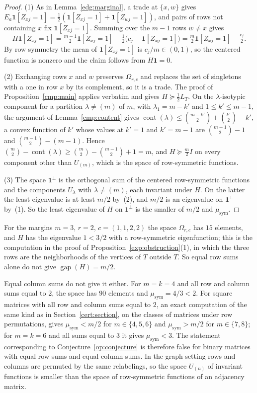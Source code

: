 \begin{proof}
(1) As in Lemma~\ref{edg:marginal}, a trade at $\{x,w\}$ gives
$E_a\mathbf1[Z_{xj}=1]=\tfrac12(\mathbf1[Z_{xj}=1]+\mathbf1[Z_{wj}=1])$, and
pairs of rows not containing $x$ fix $\mathbf1[Z_{xj}=1]$. Summing over the
$m-1$ rows $w\ne x$ gives
\[
 H\mathbf1[Z_{xj}=1]=\tfrac{m-1}2\mathbf1[Z_{xj}=1]
 -\tfrac12\bigl(c_j-\mathbf1[Z_{xj}=1]\bigr)
 =\tfrac m2\mathbf1[Z_{xj}=1]-\tfrac{c_j}2 .
\]
By row symmetry the mean of $\mathbf1[Z_{xj}=1]$ is $c_j/m\in(0,1)$, so the
centered function is nonzero and the claim follows from $H\mathbf1=0$.

(2) Exchanging rows $x$ and $w$ preserves $\Omega_{r,c}$ and replaces the set
of singletons with a one in row $x$ by its complement, so it is a trade. The
proof of Proposition~\ref{cmp:main} applies verbatim and gives
$H\succeq\tfrac12L_T$. On the $\lambda$-isotypic component for a partition
$\lambda\ne(m)$ of $m$, with $\lambda_1=m-k'$ and $1\le k'\le m-1$, the
argument of Lemma~\ref{cmp:content} gives
$\operatorname{cont}(\lambda)\le\binom{m-k'}2+\binom{k'}2-k'$, a convex
function of $k'$ whose values at $k'=1$ and $k'=m-1$ are
$\binom{m-1}2-1$ and $\binom{m-1}2-(m-1)$. Hence
$\binom m2-\operatorname{cont}(\lambda)\ge\binom m2-\binom{m-1}2+1=m$, and
$H\succeq\tfrac m2I$ on every component other than $U_{(m)}$, which is the
space of row-symmetric functions.

(3) The space $\mathbf1^\perp$ is the orthogonal sum of the centered
row-symmetric functions and the components $U_\lambda$ with
$\lambda\ne(m)$, each invariant under $H$. On the latter the least eigenvalue
is at least $m/2$ by~(2), and $m/2$ is an eigenvalue on $\mathbf1^\perp$
by~(1). So the least eigenvalue of $H$ on $\mathbf1^\perp$ is the smaller of
$m/2$ and $\mu_{\mathrm{sym}}$.
\end{proof}

For the margins $m=3$, $r=2$, $c=(1,1,2,2)$ the space $\Omega_{r,c}$ has $15$
elements, and $H$ has the eigenvalue $1<3/2$ with a row-symmetric
eigenfunction; this is the computation in the proof of
Proposition~\ref{exp:obstruction}(1), in which the three rows are the
neighborhoods of the vertices of $T$ outside $T$. So equal row sums alone do
not give $\operatorname{gap}(H)=m/2$.

Equal column sums do not give it either. For $m=k=4$ and all row and column
sums equal to $2$, the space has $90$ elements and
$\mu_{\mathrm{sym}}=4/3<2$. For square matrices with all row and column sums
equal to $2$, an exact computation of the same kind as in
Section~\ref{cert:section}, on the classes of matrices under row
permutations, gives $\mu_{\mathrm{sym}}<m/2$ for $m\in\{4,5,6\}$ and
$\mu_{\mathrm{sym}}>m/2$ for $m\in\{7,8\}$; for $m=k=6$ and all sums equal to
$3$ it gives $\mu_{\mathrm{sym}}<3$. The statement corresponding to
Conjecture~\ref{op:conjecture} is therefore false for binary matrices with
equal row sums and equal column sums. In the graph setting rows and columns are permuted by the same relabelings,
so the space $U_{(n)}$ of invariant functions is smaller than the space of
row-symmetric functions of an adjacency matrix.

